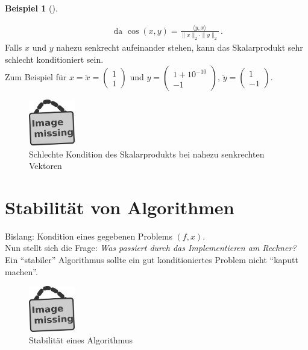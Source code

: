 \documentclass[ngerman,fontsize=11pt, paper=a4, parskip=half, titlepage=true, toc=bib]{scrbook}
\theoremstyle{definition}
\newtheorem{Bsp}[Def]{Beispiel}
\theoremstyle{plain}
\newcommand{\sectione}[1]{\section{#1} \setcounter{equation}{0}}
\newenvironment{Bspe}[1][]{ %
	\begin{Bsp}[#1]
	}
	{
	\end{Bsp}
	\addtocounter{subsection}{1}
}
\begin{document}
\begin{Bspe}
\begin{enumerate}[a)]
\begin{align*}
				&&&				\text{	da  }\cos(x,y) = \frac{\langle y,x \rangle}{\|x\|_2 \cdot \|y\|_2} \, . 
				\end{align*}
				Falls $x$ und $y$ nahezu senkrecht aufeinander stehen, kann das Skalarprodukt sehr schlecht konditioniert sein. \\
				Zum Beispiel für $x=\widetilde{x} = \begin{pmatrix} 1 \\1 \end{pmatrix}$
				und $y=\begin{pmatrix} 1+10^{-10} \\-1 \end{pmatrix},
				\, \widetilde{y}=\begin{pmatrix} 1 \\-1 \end{pmatrix}$. \\
				\begin{figure}
					\parbox{\linewidth}{
						\centering
						\includegraphics[width=2cm]{images/image_missing.jpg}
						}
						\caption{Schlechte Kondition des Skalarprodukts bei nahezu senkrechten Vektoren}
				\end{figure}
	\end{enumerate}	
\end{Bspe}

  \sectione{Stabilität von Algorithmen}
  Bislang: Kondition eines gegebenen Problems $(f,x)$. \\
  Nun stellt sich die Frage: \textit{Was passiert durch das Implementieren am Rechner? }\\
  Ein \enquote{stabiler} Algorithmus sollte ein gut konditioniertes Problem nicht \enquote{kaputt machen}.\\

  \begin{figure}
    \parbox{\linewidth}{
      \centering
      \includegraphics[width=2cm]{images/image_missing.jpg}
    }
    \caption{Stabilität eines Algorithmus}
  \end{figure}
\end{document}
